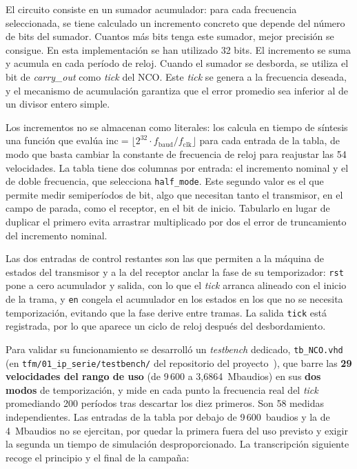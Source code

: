 El circuito consiste en un sumador acumulador: para cada frecuencia seleccionada, se tiene
calculado un incremento concreto que depende del número de bits del sumador. Cuantos más
bits tenga este sumador, mejor precisión se consigue. En esta implementación se han
utilizado 32 bits. El incremento se suma y acumula en cada período de reloj. Cuando el
sumador se desborda, se utiliza el bit de \textit{carry\_out} como \textit{tick} del NCO. Este \textit{tick} se genera
a la frecuencia deseada, y el mecanismo de acumulación garantiza que el error promedio sea
inferior al de un divisor entero simple.

Los incrementos no se almacenan como literales: los calcula en tiempo de síntesis una función
que evalúa $\mathrm{inc} = \lfloor 2^{32} \cdot f_{\mathrm{baud}} / f_{\mathrm{clk}} \rfloor$ para
cada entrada de la tabla, de modo que basta cambiar la constante de frecuencia de reloj para
reajustar las 54 velocidades. La tabla tiene dos columnas por entrada: el incremento nominal y el
de doble frecuencia, que selecciona \texttt{half\_mode}. Este segundo valor es el que permite medir
semiperíodos de bit, algo que necesitan tanto el transmisor, en el campo de parada, como el
receptor, en el bit de inicio. Tabularlo en lugar de duplicar el primero evita arrastrar
multiplicado por dos el error de truncamiento del incremento nominal.

Las dos entradas de control restantes son las que permiten a la máquina de estados del
transmisor y a la del receptor anclar la fase de su temporizador: \texttt{rst} pone a cero acumulador y
salida, con lo que el \textit{tick} arranca alineado con el inicio de la trama, y \texttt{en}
congela el acumulador en los estados en los que no se necesita temporización, evitando que la fase
derive entre tramas. La salida \texttt{tick} está registrada, por lo que aparece un ciclo de reloj
después del desbordamiento.

Para validar su funcionamiento se desarrolló un \textit{testbench} dedicado,
\texttt{tb\_NCO.vhd} (en \texttt{tfm/01\_ip\_serie/testbench/} del repositorio del
proyecto~\cite{repo_tfm}), que barre las \textbf{29 velocidades del rango de uso} (de 9\,600 a
3,6864~Mbaudios) en sus \textbf{dos modos} de temporización, y mide en cada punto la frecuencia
real del \textit{tick} promediando 200 períodos tras descartar los diez primeros. Son 58 medidas
independientes. Las entradas de la tabla por debajo de 9\,600~baudios y la de 4~Mbaudios no se
ejercitan, por quedar la primera fuera del uso previsto y exigir la segunda un tiempo de simulación
desproporcionado. La transcripción siguiente recoge el principio y el final de la campaña:

